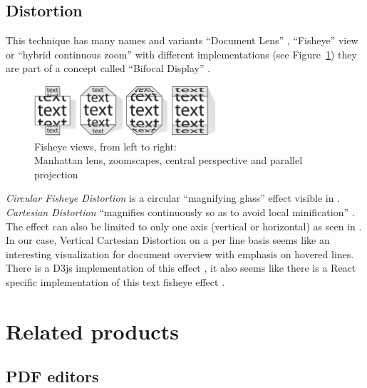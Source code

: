 \documentclass[\version]{l4proj}
\begin{document}
\subsection{Distortion}

This technique has many names and variants ``Document Lens'' \autocite{robertsonDocumentLens1993}, ``Fisheye'' view \autocite{greenbergFisheyeTextEditor1996} or ``hybrid continuous zoom'' \autocite{bartramContinuousZoomConstrained1995} with different implementations (see Figure~\ref{fig:fisheyes}) they are part of a concept called ``Bifocal Display'' \autocite{apperleyBifocalDisplay}.

\begin{figure}[H]
    \centering
    \includegraphics[width=0.6\textwidth]{images/document_visualization/different-fisheyes.png}
    \caption{Fisheye views, from left to right: \\
        Manhattan lens, zoomscapes, central perspective and parallel projection \\
        \protect\autocite{baudischFishnetFisheyeWeb2004}
    }\label{fig:fisheyes}
\end{figure}

\textit{Circular Fisheye Distortion} is a circular ``magnifying glass'' effect visible in \textcite{bostockFisheyeGrid2019}. \textit{Cartesian Distortion} ``magnifies continuously so as to avoid local minification'' \autocite{bostockFisheyeDistortion2012}. The effect can also be limited to only one axis (vertical or horizontal) as seen in \textcite{pstuffaCartesianFisheyeDistortion2019}. In our case, Vertical Cartesian Distortion on a per line basis seems like an interesting visualization for document overview with emphasis on hovered lines. There is a D3js implementation of this effect \autocite{pstuffaCartesianFisheyeDistortion2019}, it also seems like there is a React specific implementation of this text fisheye effect \autocite{zhongVincentdchanReactfisheye2019}.

\section{Related products}

\subsection{PDF editors}
\end{document}

